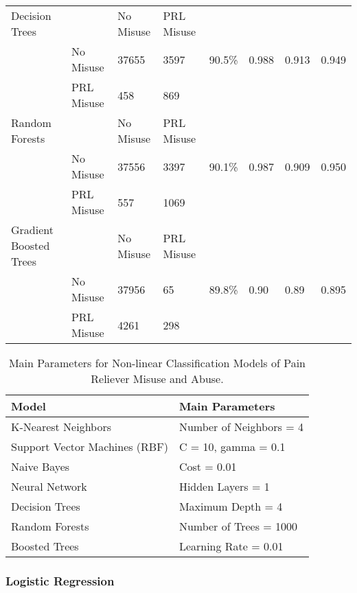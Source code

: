 \documentclass[sigconf]{acmart}
\begin{document}
\begin{table*}[ht]
\begin{tabular}{llllllll}
    \midrule
    Decision Trees & & No Misuse & PRL Misuse &  &  &  & \\
     & No Misuse & 37655 & 3597 & 90.5\% & 0.988 & 0.913 & 0.949 \\
     & PRL Misuse &  458 &  869 &  &  &  & \\
    \midrule
    Random Forests & & No Misuse & PRL Misuse &  &  &  & \\
     & No Misuse & 37556 & 3397 & 90.1\% & 0.987 & 0.909 & 0.950 \\
     & PRL Misuse &  557 & 1069 &  &  &  & \\
    \midrule
    Gradient Boosted Trees & & No Misuse & PRL Misuse &  &  &  & \\
     & No Misuse & 37956 &  65 & 89.8\% & 0.90 & 0.89 & 0.895 \\
     & PRL Misuse & 4261 & 298 &  &  &  & \\
    \bottomrule
  \end{tabular}
\end{table*}

 
\begin{table}
  \caption{Main Parameters for Non-linear Classification Models of 
  Pain Reliever Misuse and Abuse.}
  \label{tab:freq}
  \begin{tabular}{ll}
    \toprule
    Model & Main Parameters \\
    \midrule
    K-Nearest Neighbors & Number of Neighbors = 4 \\
    Support Vector Machines (RBF) & C = 10, gamma = 0.1 \\
    Naive Bayes & Cost = 0.01 \\
    Neural Network & Hidden Layers = 1 \\
    Decision Trees & Maximum Depth = 4 \\ 
    Random Forests & Number of Trees = 1000 \\
    Boosted Trees & Learning Rate = 0.01 \\ 
    \bottomrule
  \end{tabular}
\end{table}


\subsubsection{Logistic Regression}
\end{document}
